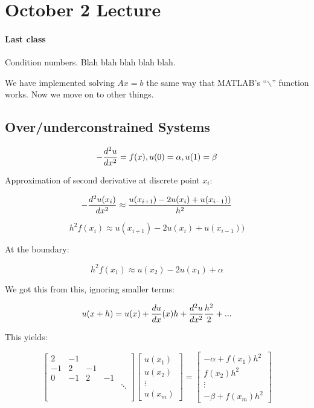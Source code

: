 \section{October 2 Lecture}

\paragraph{Last class} Condition numbers. Blah blah blah blah blah.

We have implemented solving $Ax = b$ the same way that MATLAB's ``$\backslash$'' function works. Now we move on to other things.

\subsection{Over/underconstrained Systems}

\[
	-{d^2 u \over dx^2} = f(x), u(0) = \alpha, u(1) = \beta
\]

Approximation of second derivative at discrete point $x_i$:

\[
	-{d^2 u (x_i) \over dx^2} \approx {u(x_{i+1}) - 2u(x_i)+u(x_{i-1})) \over h^2}
\]

\[
	h^2 f(x_i) \approx u(x_{i+1}) - 2u(x_i)+u(x_{i-1}))
\]

At the boundary:

\[
	h^2 f(x_1) \approx u(x_{2}) - 2u(x_1)+\alpha
\]

We got this from this, ignoring smaller terms:

\[
	u(x+h) = u(x) + {du \over dx}(x) h + {d^2u \over dx^2} {h^2 \over 2} + ... 
\]

This yields:

\[
	\begin{bmatrix}
		2 & -1 \\
		-1 & 2 & -1 \\
		0 & -1 & 2 & -1 \\
		 & & & & \ddots \\ \\ \\
	\end{bmatrix}
	\begin{bmatrix}
		u(x_1) \\ u(x_2) \\ \vdots \\ u(x_m)
	\end{bmatrix}
	=
	\begin{bmatrix}
		-\alpha + f(x_1)h^2 \\ f(x_2)h^2\\ \vdots \\ -\beta + f(x_m)h^2
	\end{bmatrix}
\]

